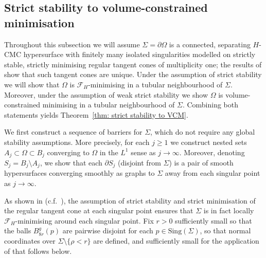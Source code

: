 \documentclass[12pt]{article}
\begin{document}
\subsection{Strict stability to volume-constrained minimisation}\label{subsec: strict stability to VCM}

Throughout this subsection we will assume $\Sigma = \partial \Omega$ is a connected, separating $H$-CMC hypersurface with finitely many isolated singularities modelled on strictly stable, strictly minimising regular tangent cones of multiplicity one; the results of \cite{S83B} show that such tangent cones are unique. Under the assumption of strict stability we will show that $\Omega$ is $\mathcal{F}_H$-minimising in a tubular neighbourhood of $\Sigma$. Moreover, under the assumption of weak strict stability we show $\Omega$ is volume-constrained minimising in a tubular neighbourhood of $\Sigma$. Combining both statements yields Theorem~\ref{thm: strict stability to VCM}.

\bigskip

We first construct a sequence of barriers for $\Sigma$, which do not require any global stability assumptions. More precisely, for each $j \geq 1$ we construct nested sets $A_j \subset \Omega \subset B_j$ converging to $\Omega$ in the $L^1$ sense as $j \rightarrow \infty$. Moreover, denoting $S_j = B_j \setminus A_j$, we show that each $\partial S_j$ (disjoint from $\Sigma$) is a pair of smooth hypersurfaces converging smoothly as graphs to $\Sigma$ away from each singular point as $j \rightarrow \infty$. 

\bigskip

As shown in \cite[Theorem 7.3]{L23} (c.f.~\cite[Theorem 4.1]{HS85}), the assumption of strict stability and strict minimisation of the regular tangent cone at each singular point ensures that $\Sigma$ is in fact locally $\mathcal{F}_H$-minimising around each singular point. Fix $r>0$ sufficiently small so that the balls $B_{8r}^g(p)$ are pairwise disjoint for each $p \in \mathrm{Sing}(\Sigma)$,  so that normal coordinates over $\Sigma\setminus\{\rho<r\}$ are defined, and sufficiently small for the application of \cite[Theorem 8.7]{L23} that follows below.


\bigskip
\end{document}

